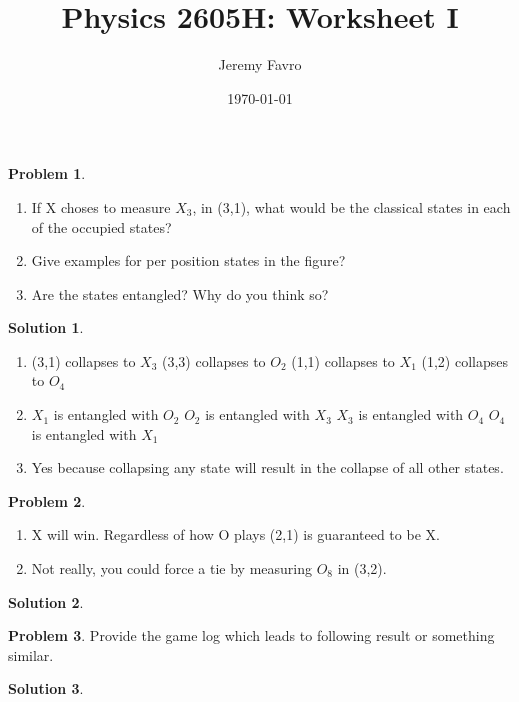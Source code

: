 \documentclass[10pt]{article}
\title{Physics 2605H: Worksheet I}
\author{Jeremy Favro}
\date{\today}
\theoremstyle{definition}
\newtheorem{problem}{Problem}
\newtheorem{soln}{Solution}
\begin{document}
\maketitle

\begin{problem}
  \begin{enumerate}[label=(\alph*)]
    \item If X choses to measure $X_3$, in (3,1), what would be the classical states in each of the occupied states?
    \item Give examples for per position states in the figure?
    \item Are the states entangled? Why do you think so?
  \end{enumerate}
\end{problem}
\begin{soln}
  \begin{enumerate}[label=(\alph*)]
    \item (3,1) collapses to $X_3$
    (3,3) collapses to $O_2$
    (1,1) collapses to $X_1$
    (1,2) collapses to $O_4$
    \item $X_1$ is entangled with $O_2$
    $O_2$ is entangled with $X_3$
    $X_3$ is entangled with $O_4$
    $O_4$ is entangled with $X_1$
    \item Yes because collapsing any state will result in the collapse of all other states.
  \end{enumerate}
\end{soln}

\begin{problem}
  \begin{enumerate}[label=(\alph*)]
    \item X will win. Regardless of how O plays (2,1) is guaranteed to be X.
    \item Not really, you could force a tie by measuring $O_8$ in (3,2).
  \end{enumerate}
\end{problem}
\begin{soln}
\end{soln}

\begin{problem}
  Provide the game log which leads to following result or something similar.
\end{problem}
\begin{soln}
  
\end{soln}
\end{document}
